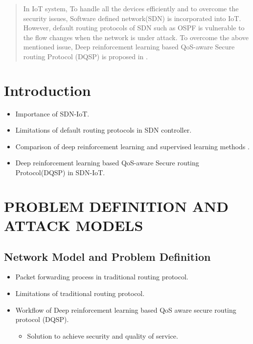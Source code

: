 %
% 


\begin{abstract}
In IoT system, To handle all the devices efficiently and to overcome the security issues, Software defined network(SDN) is incorporated into IoT. However, default routing protocols of SDN such as OSPF is vulnerable to the flow changes when the network is under attack. To overcome the above mentioned issue, Deep reinforcement learning based QoS-aware Secure routing Protocol (DQSP) is proposed in \cite{8935210}. 
\end{abstract}

\section{Introduction}
\label{sec:introduction}
\begin{itemize}
    \item Importance of SDN-IoT\cite{7939144}.
    \item Limitations of default routing protocols in SDN controller.
    \item Comparison of deep reinforcement learning and supervised learning methods \cite{8485853}.
    \item  Deep reinforcement learning based QoS-aware Secure routing Protocol(DQSP) in SDN-IoT.
\end{itemize}

\section{PROBLEM DEFINITION AND ATTACK MODELS}
\subsection{Network Model and Problem Definition}
\begin{itemize}
\item Packet forwarding process in traditional routing protocol. 
\item Limitations of traditional routing protocol.
\end{itemize}
\begin{itemize}
\item  Workflow of Deep reinforcement learning based QoS aware secure routing protocol (DQSP).
\begin{itemize}
\item Solution to achieve security and quality of service.
\end{itemize}
\end{itemize}

